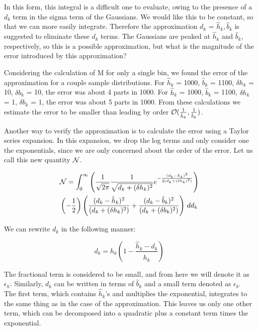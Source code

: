 \documentclass[twocolumn,twoside,prd]{revtex4} %
\begin{document}
In this form, this integral is a difficult one to evaluate, owing to the presence of a $d_k$ term in the sigma term of the Gaussians.  We would like this to be constant, so that we can more easily integrate.  Therefore the approximation $d_k$ = $\hat h_k,\hat b_k$  is suggested to eliminate these $d_k$ terms.  The Gaussians are peaked at $\hat h_k$ and $\hat b_k$, respectively, so this is a possible approximation, but what is the magnitude of the error introduced by this approximation?

Considering the calculation of M for only a single bin, we found the error of the approximation for a couple sample distributions.  For $\hat h_k$ = 1000, $\hat b_k$ = 1100, $\delta h_k$ = 10, $\delta b_k$ = 10, the error was about 4 parts in 1000.  For $\hat h_k$ = 1000, $\hat b_k$ = 1100, $\delta h_k$ = 1, $\delta b_k$ = 1, the error was about 5 parts in 1000.  From these calculations we estimate the error to be smaller than leading by order ${\cal O}(\frac{1}{\hat h_k}, \frac{1}{\hat b_k})$. 

Another way to verify the approximation is to calculate the error using a Taylor series expansion.  In this expansion, we drop the log terms and only consider one the exponentials, since we are only concerned about the order of the error.  Let us call this new quantity $\cal N$.

\begin{multline}
\label{eqn:Taylor1}
{\cal N} = \int_0^\infty {\left( \frac{1}{\sqrt{2\pi}} \frac {1}{\sqrt{d_k +(\delta h_k)^2}} e^{- \frac {(d_k - \hat h_k)^2} {2(d_k +(\delta h_k)^2)}}\right)} \\ {\left(- \frac {1}{2} \right) \left( \frac {(d_k - \hat h_k)^2} {(d_k +(\delta h_k)^2)} + \frac {(d_k - \hat b_k)^2} {(d_k +(\delta b_k)^2)} \right) \, dd_k}  \\
\end{multline}

We can rewrite $d_k$ in the following manner:

\begin{equation}
\label{eqn:Taylor2}
d_k = h_k\left(1 - \frac {\hat h_k - d_k} {\hat h_k}  \right)
\end{equation}

The fractional term is considered to be small, and from here we will denote it as $\epsilon_h$.  Similarly, $d_k$ can be written in terms of $\hat b_k$ and a small term denoted as $\epsilon_b$.  The first term, which contains $\hat h_k$'s and multiplies the exponential, integrates to the same thing as in the case of the approximation.  This leaves us only one other term, which can be decomposed into a quadratic plus a constant term times the exponential.
\end{document}
